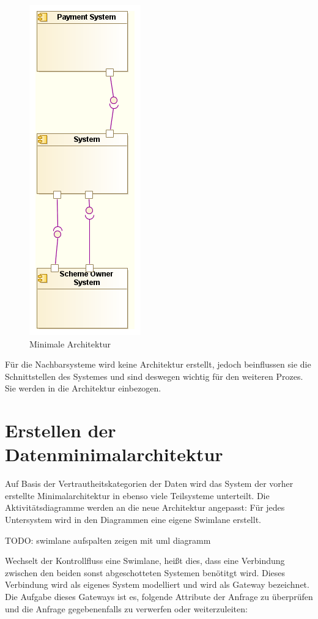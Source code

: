 \begin{figure}[!htbp]
    \centering
    \includegraphics[scale=0.5]{uml/minimalarch.png}
    \caption{Minimale Architektur}
\end{figure}

Für die Nachbarsysteme wird keine Architektur erstellt, jedoch beinflussen sie die Schnittstellen des Systemes und sind deswegen wichtig für den weiteren Prozes. Sie werden in die Architektur einbezogen.

\section{Erstellen der Datenminimalarchitektur}
Auf Basis der Vertrautheitskategorien der Daten wird das System der vorher erstellte Minimalarchitektur in ebenso viele Teilsysteme unterteilt. Die Aktivitätsdiagramme werden an die neue Architektur angepasst: Für jedes Untersystem wird in den Diagrammen eine eigene Swimlane erstellt.

TODO: swimlane aufspalten zeigen mit uml diagramm

Wechselt der Kontrollfluss eine Swimlane, heißt dies, dass eine Verbindung zwischen den beiden sonst abgeschotteten Systemen benötitgt wird. Dieses Verbindung wird als eigenes System modelliert und wird als Gateway bezeichnet. Die Aufgabe dieses Gateways ist es, folgende Attribute der Anfrage zu überprüfen und die Anfrage gegebenenfalls zu verwerfen oder weiterzuleiten:

